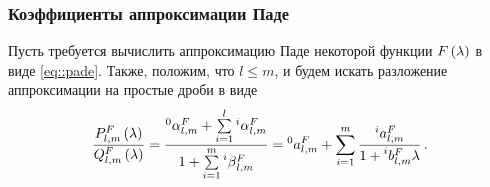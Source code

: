 \documentclass[../document.tex]{subfiles}
\begin{document}
            \subsubsection{Коэффициенты аппроксимации Паде\label{sec::PADE}}
                \par Пусть требуется вычислить аппроксимацию Паде некоторой функции $F\left(\lambda\right)$ в виде \eqref{eq::pade}. Также, положим, что $l\leqslant m$, и будем искать разложение аппроксимации на простые дроби в виде
                \begin{equation}
                    \frac{P_{l,m}^F\left(\lambda\right)}{Q_{l,m}^F\left(\lambda\right)}=\frac{\prescript{0}{}{\alpha}_{l,m}^F+\sum\limits_{i=1}^l\prescript{i}{}{\alpha}_{l,m}^F}{1+\sum\limits_{i=1}^m\prescript{i}{}{\beta}_{l,m}^F}=\prescript{0}{}{a}_{l,m}^F+\sum\limits_{i=1}^m\frac{\prescript{i}{}{a}_{l,m}^F}{1+\prescript{i}{}{b}_{l,m}^F\lambda}\,.
                \end{equation}
\end{document}
